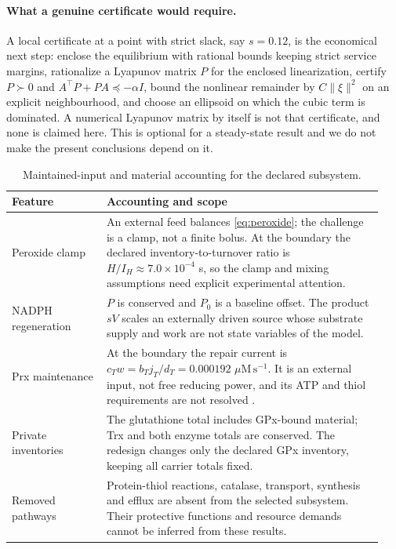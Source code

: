 \documentclass[11pt,a4paper]{article}
\theoremstyle{plain}
\theoremstyle{definition}
\theoremstyle{remark}
\newcommand{\fluxunit}{\ensuremath{\mu\mathrm{M}\,\mathrm{s}^{-1}}}
\begin{document}
\paragraph{What a genuine certificate would require.}
A local certificate at a point with strict slack, say $s=0.12$, is the economical
next step: enclose the equilibrium with rational bounds keeping strict service
margins, rationalize a Lyapunov matrix $P$ for the enclosed linearization, certify
$P\succ0$ and $A^{\!\top}P+PA\preceq-\alpha I$, bound the nonlinear remainder by
$C\|\xi\|^2$ on an explicit neighbourhood, and choose an ellipsoid on which the
cubic term is dominated. A numerical Lyapunov matrix by itself is not that
certificate, and none is claimed here. This is optional for a steady-state result
and we do not make the present conclusions depend on it.

\begin{table}[tb]
\centering\small
\caption{Maintained-input and material accounting for the declared subsystem.}
\label{tab:accounting}
\begin{tabular}{p{0.24\linewidth}p{0.70\linewidth}}
\toprule
Feature & Accounting and scope\\
\midrule
Peroxide clamp & An external feed balances \eqref{eq:peroxide}; the challenge is a
clamp, not a finite bolus. At the boundary the declared inventory-to-turnover ratio
is $H/I_H\approx7.0\times10^{-4}$ s, so the clamp and mixing assumptions need
explicit experimental attention.\\
NADPH regeneration & $P$ is conserved and $P_0$ is a baseline offset. The product
$sV$ scales an externally driven source whose substrate supply and work are not
state variables of the model.\\
Prx maintenance & At the boundary the repair current is
$c_Tw=b_Tj_T/d_T=0.000192$ \fluxunit. It is an external input, not free reducing
power, and its ATP and thiol requirements are not resolved
\citep{jonsson2008}.\\
Private inventories & The glutathione total includes GPx-bound material; Trx and
both enzyme totals are conserved. The redesign changes only the declared GPx
inventory, keeping all carrier totals fixed.\\
Removed pathways & Protein-thiol reactions, catalase, transport, synthesis and
efflux are absent from the selected subsystem. Their protective functions and
resource demands cannot be inferred from these results.\\
\bottomrule
\end{tabular}
\end{table}
\end{document}
